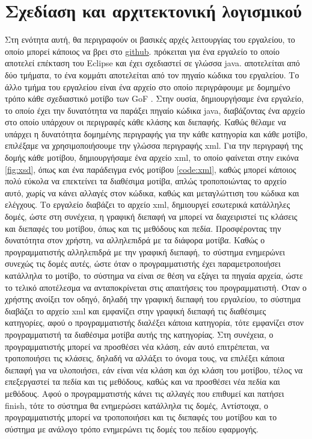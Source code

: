 \chapter{Σχεδίαση και αρχιτεκτονική λογισμικού}
\label{ch:architecture}
Στη ενότητα αυτή, θα περιγραφούν οι βασικές αρχές λειτουργίας του εργαλείου, το οποίο μπορεί κάποιος να βρει 
στο \href{https://github.com/tasakos-dev/Design-pattern-builder}{\color{blue}\underline{github}}. 
πρόκειται για ένα εργαλείο το οποίο αποτελεί επέκταση του Eclipse και έχει σχεδιαστεί σε γλώσσα java. 
αποτελείται από δύο τμήματα, το ένα κομμάτι αποτελείται από τον πηγαίο κώδικα του εργαλείου. Το άλλο τμήμα του εργαλείου είναι 
ένα αρχείο στο οποίο περιγράφουμε με δομημένο τρόπο κάθε σχεδιαστικό μοτίβο των GoF \cite{GoF}. Στην ουσία, δημιουργήσαμε ένα εργαλείο, 
το οποίο έχει την δυνατότητα να παράξει πηγαίο κώδικα java, διαβάζοντας ένα αρχείο στο οποίο υπάρχουν οι περιγραφές 
κάθε κλάσης και διεπαφής. Καθώς θέλαμε να υπάρχει η δυνατότητα δομημένης περιγραφής για την κάθε κατηγορία και κάθε μοτίβο, επιλέξαμε 
να χρησιμοποιήσουμε την γλώσσα περιγραφής xml. Για την περιγραφή της δομής κάθε μοτίβου, 
δημιουργήσαμε ένα αρχείο xml, το οποίο φαίνεται στην εικόνα \ref{fig:xsd}, όπως και ένα παράδειγμα ενός μοτίβου \ref{code:xml}, 
καθώς μπορεί κάποιος πολύ εύκολα να επεκτείνει τα διαθέσιμα μοτίβα, απλώς τροποποιώντας το αρχείο αυτό, 
χωρίς να κάνει αλλαγές στον κώδικα, καθώς και μεταγλώττιση του κώδικα και ελέγχους. 
Το εργαλείο διαβάζει το αρχείο xml, δημιουργεί εσωτερικά κατάλληλες δομές, ώστε στη συνέχεια, η γραφική διεπαφή 
να μπορεί να διαχειριστεί τις κλάσεις και διεπαφές του μοτίβου, όπως και τις μεθόδους και πεδία. Προσφέροντας την δυνατότητα στον χρήστη, 
να αλληλεπιδρά με τα διάφορα μοτίβα. Καθώς ο προγραμματιστής αλληλεπιδρά με την γραφική διεπαφή, 
το σύστημα ενημερώνει συνεχώς τις δομές αυτές, ώστε όταν ο προγραμματιστής έχει παραμετροποιήσει κατάλληλα το μοτίβο, 
το σύστημα να είναι σε θέση να εξάγει τα πηγαία αρχεία, ώστε το τελικό αποτέλεσμα να ανταποκρίνεται στις απαιτήσεις του προγραμματιστή.
\newline \newline
Όταν ο χρήστης ανοίξει τον οδηγό, δηλαδή την γραφική διεπαφή του εργαλείου, το σύστημα διαβάζει το αρχείο xml 
και εμφανίζει στην γραφική διεπαφή τις διαθέσιμες κατηγορίες, αφού ο προγραμματιστής διαλέξει κάποια κατηγορία, 
τότε εμφανίζει στον προγραμματιστή τα διαθέσιμα μοτίβα αυτής της κατηγορίας. Στη συνέχεια, 
ο προγραμματιστής μπορεί να προσθέσει νέα κλάση, εάν αυτό επιτρέπεται, να τροποποιήσει τις κλάσεις, δηλαδή να αλλάξει το όνομα τους, 
να επιλέξει κάποια διεπαφή για να υλοποιήσει, εάν είναι νέα κλάση και όχι κλάση του μοτίβου, 
τέλος να επεξεργαστεί τα πεδία και τις μεθόδους, καθώς και να προσθέσει νέα πεδία και μεθόδους. Αφού ο προγραμματιστής κάνει τις αλλαγές που επιθυμεί και πατήσει
finish, τότε το σύστημα θα ενημερώσει κατάλληλα τις δομές,  Αντίστοιχα, ο προγραμματιστής μπορεί να τροποποιήσει 
και τις διεπαφές του μοτίβου και το σύστημα με ανάλογο τρόπο ενημερώνει τις δομές του πεδίου εφαρμογής. \newline \newline

